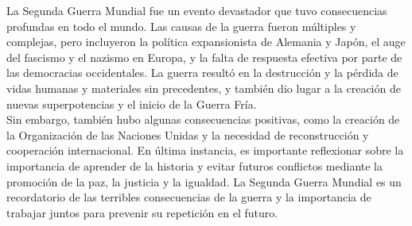 \documentclass{article}
\theoremstyle{mytheoremstyle}
\theoremstyle{mytheoremstyle}
\theoremstyle{myproblemstyle}
\begin{document}
La Segunda Guerra Mundial fue un evento devastador que tuvo consecuencias profundas en todo el mundo. Las causas de la guerra fueron múltiples y complejas, pero incluyeron la política expansionista de Alemania y Japón, el auge del fascismo y el nazismo en Europa, y la falta de respuesta efectiva por parte de las democracias occidentales. La guerra resultó en la destrucción y la pérdida de vidas humanas y materiales sin precedentes, y también dio lugar a la creación de nuevas superpotencias y el inicio de la Guerra Fría.\\

Sin embargo, también hubo algunas consecuencias positivas, como la creación de la Organización de las Naciones Unidas y la necesidad de reconstrucción y cooperación internacional. En última instancia, es importante reflexionar sobre la importancia de aprender de la historia y evitar futuros conflictos mediante la promoción de la paz, la justicia y la igualdad. La Segunda Guerra Mundial es un recordatorio de las terribles consecuencias de la guerra y la importancia de trabajar juntos para prevenir su repetición en el futuro.\\
\end{document}
